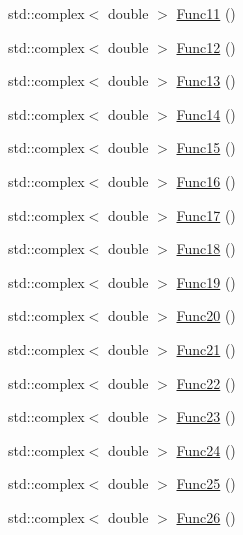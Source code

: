 \begin{DoxyCompactItemize}
std\-::complex$<$ double $>$ \hyperlink{classosea_1_1ofreq_1_1_eqn_rotation_a09824152fde4753f92c43b3e5349945f}{Func11} ()
\item 
std\-::complex$<$ double $>$ \hyperlink{classosea_1_1ofreq_1_1_eqn_rotation_a2e33b2550ba59540fc51bb7a7b14571a}{Func12} ()
\item 
std\-::complex$<$ double $>$ \hyperlink{classosea_1_1ofreq_1_1_eqn_rotation_add172711c06e6d1005abb189c8aadb73}{Func13} ()
\item 
std\-::complex$<$ double $>$ \hyperlink{classosea_1_1ofreq_1_1_eqn_rotation_ab4cd991007cee1378db58ea5d97f9d1a}{Func14} ()
\item 
std\-::complex$<$ double $>$ \hyperlink{classosea_1_1ofreq_1_1_eqn_rotation_a9c56e18a6c7c21295a005c2da44b0cec}{Func15} ()
\item 
std\-::complex$<$ double $>$ \hyperlink{classosea_1_1ofreq_1_1_eqn_rotation_a4a6c181a7c9dffc1d6d987f47d859485}{Func16} ()
\item 
std\-::complex$<$ double $>$ \hyperlink{classosea_1_1ofreq_1_1_eqn_rotation_ad9d03b176d6793189ac15f195fd2074e}{Func17} ()
\item 
std\-::complex$<$ double $>$ \hyperlink{classosea_1_1ofreq_1_1_eqn_rotation_a0165c15c3668d5149e397643a3cc12a3}{Func18} ()
\item 
std\-::complex$<$ double $>$ \hyperlink{classosea_1_1ofreq_1_1_eqn_rotation_a79edd634079a32c31a49251dbd4eff9e}{Func19} ()
\item 
std\-::complex$<$ double $>$ \hyperlink{classosea_1_1ofreq_1_1_eqn_rotation_ae8a8ccd30556b2f0efe423fbac0c9801}{Func20} ()
\item 
std\-::complex$<$ double $>$ \hyperlink{classosea_1_1ofreq_1_1_eqn_rotation_a2d0eadf459134a4e08be4d02b21a1cda}{Func21} ()
\item 
std\-::complex$<$ double $>$ \hyperlink{classosea_1_1ofreq_1_1_eqn_rotation_a0b1508fc9d41d813122e55c3b1514c1d}{Func22} ()
\item 
std\-::complex$<$ double $>$ \hyperlink{classosea_1_1ofreq_1_1_eqn_rotation_af65a4aac860fcb92951fb2e8b1f7d35a}{Func23} ()
\item 
std\-::complex$<$ double $>$ \hyperlink{classosea_1_1ofreq_1_1_eqn_rotation_a9d41c3f9c2a0d1dc652c6e0e9d13c4c7}{Func24} ()
\item 
std\-::complex$<$ double $>$ \hyperlink{classosea_1_1ofreq_1_1_eqn_rotation_adcffa3c7b830fb1ca3fe0c08c4eaf016}{Func25} ()
\item 
std\-::complex$<$ double $>$ \hyperlink{classosea_1_1ofreq_1_1_eqn_rotation_a5f1c2121e3a9738ec1d4629d30b151e9}{Func26} ()

\end{DoxyCompactItemize}

